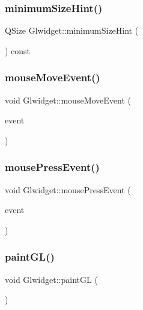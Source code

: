 \subsubsection{\texorpdfstring{minimum\+Size\+Hint()}{minimumSizeHint()}}
{\footnotesize\ttfamily Q\+Size Glwidget\+::minimum\+Size\+Hint (\begin{DoxyParamCaption}{ }\end{DoxyParamCaption}) const\hspace{0.3cm}{\ttfamily [protected]}}

\mbox{\label{class_glwidget_afc8a6da76c5ead92b1c1a4ba8f931310}} 
\subsubsection{\texorpdfstring{mouse\+Move\+Event()}{mouseMoveEvent()}}
{\footnotesize\ttfamily void Glwidget\+::mouse\+Move\+Event (\begin{DoxyParamCaption}\item[{Q\+Mouse\+Event $\ast$}]{event }\end{DoxyParamCaption})\hspace{0.3cm}{\ttfamily [protected]}}

\mbox{\label{class_glwidget_a0e3f033e0fa941505114a32d35823c70}} 
\subsubsection{\texorpdfstring{mouse\+Press\+Event()}{mousePressEvent()}}
{\footnotesize\ttfamily void Glwidget\+::mouse\+Press\+Event (\begin{DoxyParamCaption}\item[{Q\+Mouse\+Event $\ast$}]{event }\end{DoxyParamCaption})\hspace{0.3cm}{\ttfamily [protected]}}

\mbox{\label{class_glwidget_a440fe507a9bd647c1a961cf72305da31}} 
\subsubsection{\texorpdfstring{paint\+G\+L()}{paintGL()}}
{\footnotesize\ttfamily void Glwidget\+::paint\+GL (\begin{DoxyParamCaption}{ }\end{DoxyParamCaption})\hspace{0.3cm}{\ttfamily [protected]}}

